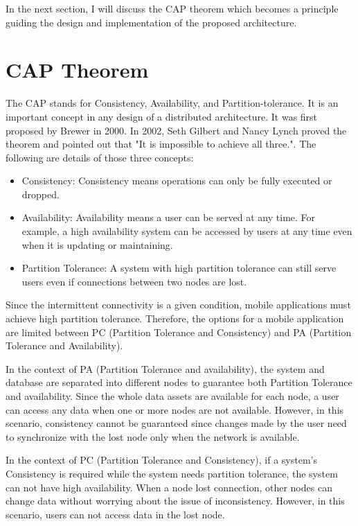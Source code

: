\documentclass{Nan_Thesis}
\begin{document}
In the next section, I will discuss the CAP theorem which becomes a principle guiding the design and implementation of the proposed architecture.
\section{CAP Theorem}
The CAP stands for Consistency, Availability, and Partition-tolerance. It is an important concept in any design of a distributed architecture. It was first proposed by Brewer in 2000. In 2002, Seth Gilbert and Nancy Lynch proved \cite{gilbert2002brewer} the theorem and pointed out that "It is impossible to achieve all three.". The following are details of those three concepts:

\begin{itemize}
  \item Consistency: Consistency means operations can only be fully executed or dropped.
  \item Availability: Availability means a user can be served at any time. For example, a high availability system can be accessed by users at any time even when it is updating or maintaining.
  \item Partition Tolerance: A system with high partition tolerance can still serve users even if connections between two nodes are lost.
\end{itemize}  

Since the intermittent connectivity is a given condition, mobile applications must achieve high partition tolerance. Therefore, the options for a mobile application are limited between PC (Partition Tolerance and Consistency) and PA (Partition Tolerance and Availability).

In the context of PA (Partition Tolerance and availability), the system and database are separated into different nodes to guarantee both Partition Tolerance and availability. Since the whole data assets are available for each node, a user can access any data when one or more nodes are not available. However, in this scenario, consistency cannot be guaranteed since changes made by the user need to synchronize with the lost node only when the network is available.

In the context of PC (Partition Tolerance and Consistency), if a system’s Consistency is required while the system needs partition tolerance, the system can not have high availability. When a node lost connection, other nodes can change data without worrying about the issue of inconsistency. However, in this scenario, users can not access data in the lost node. 
\end{document}
